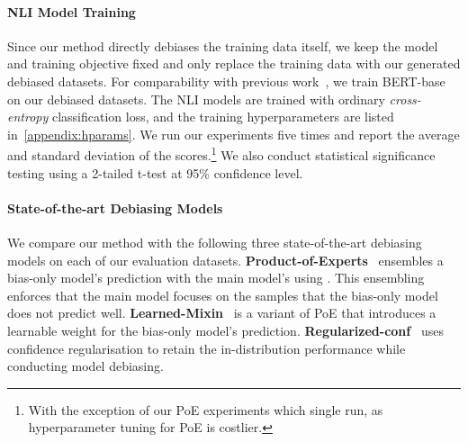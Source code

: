 \begin{table}[bt]
\begin{center}
\caption{Data size of the constructed debiased datasets for SNLI and MNLI.} \label{tab:data-size}
\end{center}
\end{table}






\paragraph{NLI Model Training}

Since our method directly debiases the training data itself, we keep the model and training objective fixed and only replace the training data with our generated debiased datasets.
For comparability with previous work~\citep{karimi-mahabadi-etal-2020-end,utama-etal-2020-mind,sanh2021learning}, we train BERT-base~\citep{bert} on our debiased datasets.
The NLI models are trained with ordinary \emph{cross-entropy} classification loss,
and the training hyperparameters are listed in~\cref{appendix:hparams}.
We run our experiments five times and report the average and standard deviation of the scores.\footnote{With the exception of our PoE experiments which single run, as hyperparameter tuning for PoE is costlier.}
We also conduct statistical significance testing using a 2-tailed t-test at 95\% confidence level.


\paragraph{State-of-the-art Debiasing Models}
We compare our method with the following three state-of-the-art debiasing models on each of our evaluation datasets.
\textbf{Product-of-Experts}~\citep{he-etal-2019-unlearn,karimi-mahabadi-etal-2020-end} ensembles a bias-only model's prediction  with the main model's  using .
This ensembling enforces that the main model focuses on the samples that the bias-only model does not predict well.
\textbf{Learned-Mixin}~\citep{clark-etal-2019-dont} is a variant of PoE that introduces a learnable weight for the bias-only model's prediction.
\textbf{Regularized-conf}~\citep{utama-etal-2020-mind} uses confidence regularisation to retain the in-distribution performance while conducting model debiasing.




